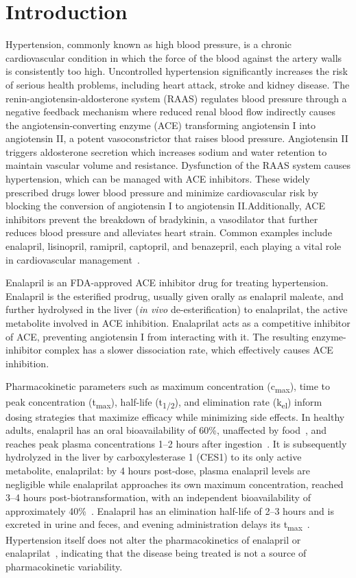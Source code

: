 \documentclass[pharmaceutics,article,submit,pdftex,moreauthors]{Definitions/mdpi}
\begin{document}
\section{Introduction}
Hypertension, commonly known as high blood pressure, is a chronic cardiovascular condition in which the force of the blood against the artery walls is consistently too high. Uncontrolled hypertension significantly increases the risk of serious health problems, including heart attack, stroke and kidney disease. The renin-angiotensin-aldosterone system (RAAS) regulates blood pressure through a negative feedback mechanism where reduced renal blood flow indirectly causes the angiotensin-converting enzyme (ACE) transforming angiotensin I into angiotensin II, a potent vasoconstrictor that raises blood pressure. Angiotensin II triggers aldosterone secretion which increases sodium and water retention to maintain vascular volume and resistance. Dysfunction of the RAAS system causes hypertension, which can be managed with ACE inhibitors. These widely prescribed drugs lower blood pressure and minimize cardiovascular risk by blocking the conversion of angiotensin I to angiotensin II.\@ Additionally, ACE inhibitors prevent the breakdown of bradykinin, a vasodilator that further reduces blood pressure and alleviates heart strain. Common examples include enalapril, lisinopril, ramipril, captopril, and benazepril, each playing a vital role in cardiovascular management~\cite{Vertes1992}.

Enalapril is an FDA-approved ACE inhibitor drug for treating hypertension. Enalapril is the esterified prodrug, usually given orally as enalapril maleate, and further hydrolysed in the liver (\textit{in vivo} de-esterification) to enalaprilat, the active metabolite involved in ACE inhibition. Enalaprilat acts as a competitive inhibitor of ACE, preventing angiotensin I from interacting with it. The resulting enzyme-inhibitor complex has a slower dissociation rate, which effectively causes ACE inhibition. 

Pharmacokinetic parameters such as maximum concentration (c\textsubscript{max}), time to peak concentration (t\textsubscript{max}), half-life (t\textsubscript{1/2}), and elimination rate (k\textsubscript{el}) inform dosing strategies that maximize efficacy while minimizing side effects. In healthy adults, enalapril has an oral bioavailability of 60\%, unaffected by food~\cite{Swanson1984}, and reaches peak plasma concentrations 1--2 hours after ingestion~\cite{Dickstein1987, MacFadyen1993, Ulm1983, VanHecken2020}. It is subsequently hydrolyzed in the liver by carboxylesterase 1 (CES1) to its only active metabolite, enalaprilat: by 4 hours post-dose, plasma enalapril levels are negligible while enalaprilat approaches its own maximum concentration, reached 3--4 hours post-biotransformation, with an independent bioavailability of approximately 40\%~\cite{Davies1984, Till1984}. Enalapril has an elimination half-life of 2--3 hours and is excreted in urine and feces, and evening administration delays its t\textsubscript{max}~\cite{Weisser1991}. Hypertension itself does not alter the pharmacokinetics of enalapril or enalaprilat~\cite{Todd1992b}, indicating that the disease being treated is not a source of pharmacokinetic variability.
\end{document}
